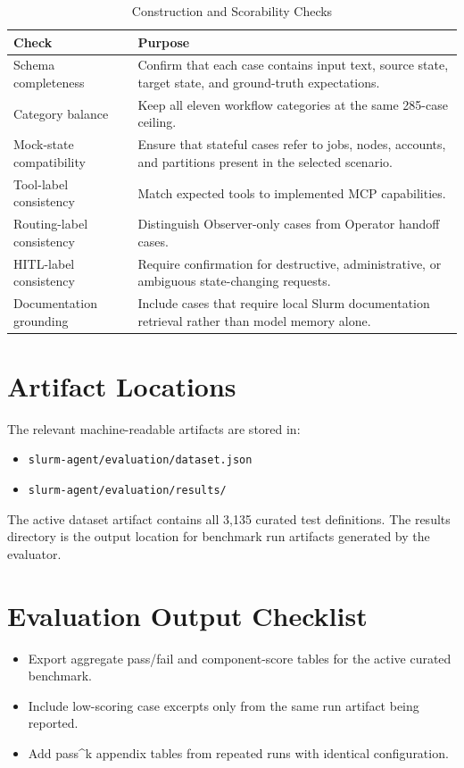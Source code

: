 \begin{table}[H]
\centering
\caption{Construction and Scorability Checks}
\label{tab:appendix-construction-checks}
\begin{tabular}{|p{4cm}|p{8cm}|}
\hline
\textbf{Check} & \textbf{Purpose} \\
\hline
Schema completeness & Confirm that each case contains input text, source state, target state, and ground-truth expectations. \\
Category balance & Keep all eleven workflow categories at the same 285-case ceiling. \\
Mock-state compatibility & Ensure that stateful cases refer to jobs, nodes, accounts, and partitions present in the selected scenario. \\
Tool-label consistency & Match expected tools to implemented MCP capabilities. \\
Routing-label consistency & Distinguish Observer-only cases from Operator handoff cases. \\
HITL-label consistency & Require confirmation for destructive, administrative, or ambiguous state-changing requests. \\
Documentation grounding & Include cases that require local Slurm documentation retrieval rather than model memory alone. \\
\hline
\end{tabular}
\end{table}

\section{Artifact Locations}

The relevant machine-readable artifacts are stored in:

\begin{itemize}
    \item \texttt{slurm-agent/evaluation/dataset.json}
    \item \texttt{slurm-agent/evaluation/results/}
\end{itemize}

The active dataset artifact contains all 3,135 curated test definitions. The results directory is the output location for benchmark run artifacts generated by the evaluator.

\section{Evaluation Output Checklist}

\begin{itemize}
    \item Export aggregate pass/fail and component-score tables for the active curated benchmark.
    \item Include low-scoring case excerpts only from the same run artifact being reported.
    \item Add pass\textasciicircum{}k appendix tables from repeated runs with identical configuration.
\end{itemize}